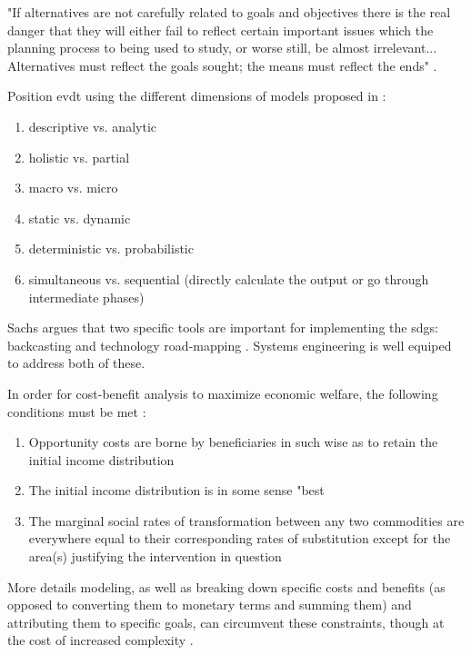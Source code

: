 "If alternatives are not carefully related to goals and objectives there is the real danger that they will either fail to reflect certain important issues which the planning process to being used to study, or worse still, be almost irrelevant... Alternatives must reflect the goals sought; the means must reflect the ends" \cite{mcloughlinChartingPossibleCourses1972}.



Position \ac{evdt} using the different dimensions of models proposed in \cite{harrisQuantitativeModelsUrban1972}:

\begin{enumerate}[itemsep=0pt,parsep=0pt]
	\item{descriptive vs. analytic}
	\item{holistic vs. partial}
	\item{macro vs. micro}
	\item{static vs. dynamic}
	\item{deterministic vs. probabilistic}
	\item{simultaneous vs. sequential (directly calculate the output or go through intermediate phases)}
\end{enumerate}


Sachs argues that two specific tools are important for implementing the \acp{sdg}: backcasting and technology road-mapping \cite{sachsAgeSustainableDevelopment2015}. Systems engineering is well equiped to address both of these.


In order for cost-benefit analysis to maximize economic welfare, the following conditions must be met \cite{krutillaWelfareAspectsBenefitCost1961}:

\begin{enumerate}[itemsep=0pt,parsep=0pt]
	\item{Opportunity costs are borne by beneficiaries in  such wise as to retain the initial income distribution}
	\item{The initial income distribution is in some sense "best}
	\item{The marginal social rates of transformation between any two commodities are everywhere equal to their corresponding rates of substitution except for the area(s) justifying the intervention in question}
\end{enumerate}

More details modeling, as well as breaking down specific costs and benefits (as opposed to converting them to monetary terms and summing them) and attributing them to specific goals, can circumvent these constraints, though at the cost of increased complexity \cite{hillGoalsAchievementMatrixEvaluating1972}.

